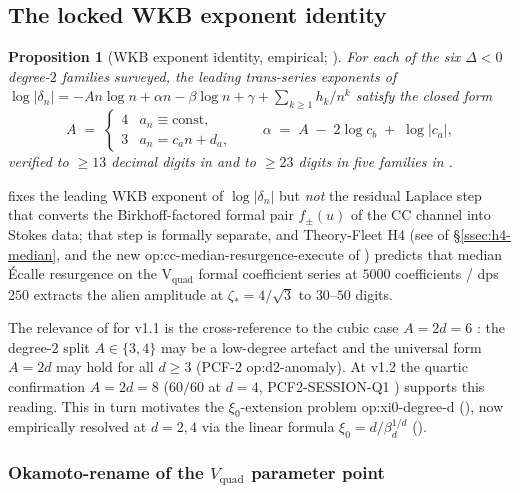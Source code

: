 \documentclass[11pt,reqno]{amsart}
\theoremstyle{plain}
\newtheorem{proposition}[theorem]{Proposition}
\theoremstyle{definition}
\theoremstyle{remark}
\newcommand{\CC}{\mathrm{CC}}
\newcommand{\Vquad}{V_{\mathrm{quad}}}
\newcommand{\dn}{\delta_{n}}
\begin{document}
\subsection{The locked WKB exponent identity}
\label{ssec:wkb}

\begin{proposition}[WKB exponent identity, empirical;
\cite{siarc_pcf1_v13,siarc_borel_kscan,siarc_cc_pipeline_f}]
\label{prop:wkb}
For each of the six $\Delta<0$ degree-$2$ families surveyed,
the leading trans-series exponents of
$\log|\dn| = -A n \log n + \alpha n - \beta \log n + \gamma
+ \sum_{k \ge 1} h_k / n^k$
satisfy the closed form
\[
  A \;=\; \begin{cases} 4 & a_n \equiv \text{const}, \\
                        3 & a_n = c_a n + d_a, \end{cases}
  \qquad
  \alpha \;=\; A \;-\; 2 \log c_b \;+\; \log|c_a|,
\]
verified to $\geq 13$ decimal digits in
\cite{siarc_borel_kscan} and to $\ge 23$ digits in
five families in \cite{siarc_cc_pipeline_f}.
\end{proposition}

 fixes the leading WKB exponent of
$\log|\dn|$ but \emph{not} the residual Laplace step that
converts the Birkhoff-factored formal pair $f_\pm(u)$ of the
$\CC$ channel into Stokes data; that step is formally
separate, and Theory-Fleet H4 (see 
of \S\ref{ssec:h4-median}, and the new
\textsf{op:cc-median-resurgence-execute} of
) predicts that median \'Ecalle resurgence
on the V$_{\mathrm{quad}}$ formal coefficient series at
$5000$ coefficients / dps $250$ extracts the alien
amplitude at $\zeta_*=4/\sqrt 3$ to $30$--$50$ digits.

The relevance of  for v1.1 is the
cross-reference to the cubic case
$A = 2d = 6$ \cite{siarc_pcf2_v11}: the degree-$2$ split
$A \in \{3, 4\}$ may be a low-degree artefact and the
universal form $A = 2d$ may hold for all $d \ge 3$ (PCF-2
\textsf{op:d2-anomaly}). At v1.2 the quartic confirmation
$A = 2d = 8$ ($60/60$ at $d=4$, PCF2-SESSION-Q1
\cite{siarc_pcf2_session_q1}) supports this reading. This in
turn motivates the $\xi_0$-extension problem
\textsf{op:xi0-degree-d} (), now empirically
resolved at $d=2,4$ via the linear formula
$\xi_0 = d / \beta_d^{1/d}$ ().

\subsubsection*{Okamoto-rename of the $\Vquad$ parameter point}
\label{sssec:okamoto-rename}
\end{document}
